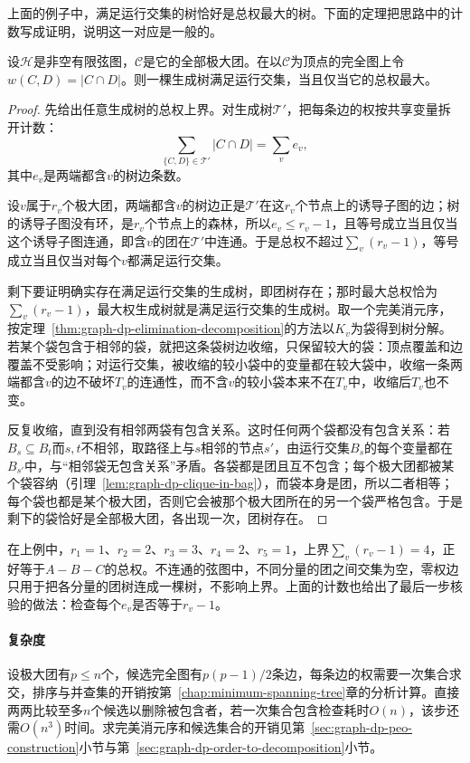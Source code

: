 上面的例子中，满足运行交集的树恰好是总权最大的树。下面的定理把思路中的计数写成证明，说明这一对应是一般的。

\begin{theorem}[团树与最大权生成树]
\label{thm:graph-dp-clique-tree-mst}
设$\mathcal H$是非空有限弦图，$\mathcal C$是它的全部极大团。在以$\mathcal C$为顶点的完全图上令$w(C,D)=|C\cap D|$。则一棵生成树满足运行交集，当且仅当它的总权最大。
\end{theorem}

\begin{proof}
先给出任意生成树的总权上界。对生成树$\mathcal T'$，把每条边的权按共享变量拆开计数：
\[
\sum_{\{C,D\}\in\mathcal T'}|C\cap D|=\sum_{v}e_v,
\]
其中$e_v$是两端都含$v$的树边条数。

设$v$属于$r_v$个极大团，两端都含$v$的树边正是$\mathcal T'$在这$r_v$个节点上的诱导子图的边；树的诱导子图没有环，是$r_v$个节点上的森林，所以$e_v\leq r_v-1$，且等号成立当且仅当这个诱导子图连通，即含$v$的团在$\mathcal T'$中连通。于是总权不超过$\sum_v(r_v-1)$，等号成立当且仅当对每个$v$都满足运行交集。

剩下要证明确实存在满足运行交集的生成树，即团树存在；那时最大总权恰为$\sum_v(r_v-1)$，最大权生成树就是满足运行交集的生成树。取一个完美消元序，按定理~\ref{thm:graph-dp-elimination-decomposition}的方法以$K_v$为袋得到树分解。若某个袋包含于相邻的袋，就把这条袋树边收缩，只保留较大的袋：顶点覆盖和边覆盖不受影响；对运行交集，被收缩的较小袋中的变量都在较大袋中，收缩一条两端都含$v$的边不破坏$T_v$的连通性，而不含$v$的较小袋本来不在$T_v$中，收缩后$T_v$也不变。

反复收缩，直到没有相邻两袋有包含关系。这时任何两个袋都没有包含关系：若$B_s\subseteq B_t$而$s,t$不相邻，取路径上与$s$相邻的节点$s'$，由运行交集$B_s$的每个变量都在$B_{s'}$中，与“相邻袋无包含关系”矛盾。各袋都是团且互不包含；每个极大团都被某个袋容纳（引理~\ref{lem:graph-dp-clique-in-bag}），而袋本身是团，所以二者相等；每个袋也都是某个极大团，否则它会被那个极大团所在的另一个袋严格包含。于是剩下的袋恰好是全部极大团，各出现一次，团树存在。
\end{proof}

在上例中，$r_1=1$、$r_2=2$、$r_3=3$、$r_4=2$、$r_5=1$，上界$\sum_v(r_v-1)=4$，正好等于$A-B-C$的总权。不连通的弦图中，不同分量的团之间交集为空，零权边只用于把各分量的团树连成一棵树，不影响上界。上面的计数也给出了最后一步核验的做法：检查每个$e_v$是否等于$r_v-1$。

\paragraph{复杂度}
设极大团有$p\leq n$个，候选完全图有$p(p-1)/2$条边，每条边的权需要一次集合求交，排序与并查集的开销按第~\ref{chap:minimum-spanning-tree}章的分析计算。直接两两比较至多$n$个候选以删除被包含者，若一次集合包含检查耗时$O(n)$，该步还需$O(n^3)$时间。求完美消元序和候选集合的开销见第~\ref{sec:graph-dp-peo-construction}小节与第~\ref{sec:graph-dp-order-to-decomposition}小节。

